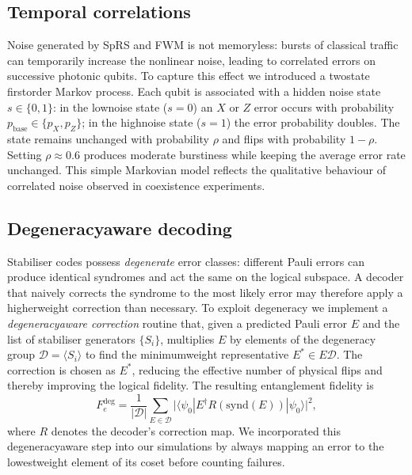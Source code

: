 \documentclass[conference]{IEEEtran}  %
\begin{document}
\subsection{Temporal correlations}
Noise generated by SpRS and FWM is not memoryless: bursts of classical traffic can temporarily increase the nonlinear noise, leading to correlated errors on successive photonic qubits.  To capture this effect we introduced a two\textendash state first\textendash order Markov process.  Each qubit is associated with a hidden noise state $s\in\{0,1\}$: in the low\textendash noise state ($s=0$) an $X$ or $Z$ error occurs with probability $p_{\text{base}}\in\{p_X,p_Z\}$; in the high\textendash noise state ($s=1$) the error probability doubles.  The state remains unchanged with probability $\rho$ and flips with probability $1-\rho$.  Setting $\rho\approx 0.6$ produces moderate burstiness while keeping the average error rate unchanged.  This simple Markovian model reflects the qualitative behaviour of correlated noise observed in coexistence experiments.

\subsection{Degeneracy\textendash aware decoding}
Stabiliser codes possess \emph{degenerate} error classes: different Pauli errors can produce identical syndromes and act the same on the logical subspace.  A decoder that naively corrects the syndrome to the most likely error may therefore apply a higher\textendash weight correction than necessary.  To exploit degeneracy we implement a \emph{degeneracy\textendash aware correction} routine that, given a predicted Pauli error $E$ and the list of stabiliser generators $\{S_i\}$, multiplies $E$ by elements of the degeneracy group $\mathcal{D}=\langle S_i\rangle$ to find the minimum\textendash weight representative $E^{\ast}\in E\mathcal{D}$.  The correction is chosen as $E^{\ast}$, reducing the effective number of physical flips and thereby improving the logical fidelity.  The resulting entanglement fidelity is
\begin{equation}
  F_e^{\text{deg}} = \frac{1}{|\mathcal{D}|} \sum_{E\in\mathcal{D}} \bigl|\langle \psi_0 | E^{\dagger} R(\text{synd}(E)) | \psi_0 \rangle\bigr|^2,
\end{equation}
where $R$ denotes the decoder’s correction map.  We incorporated this degeneracy\textendash aware step into our simulations by always mapping an error to the lowest\textendash weight element of its coset before counting failures.
\end{document}
